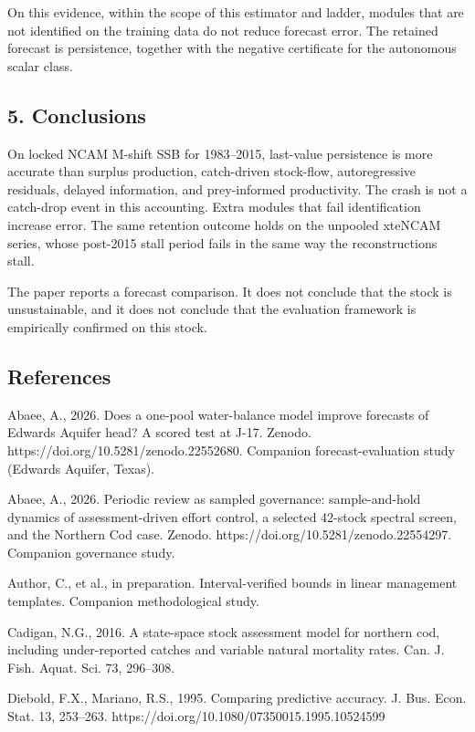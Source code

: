 \documentclass[11pt]{article}
\begin{document}
On this evidence, within the scope of this estimator and ladder, modules
that are not identified on the training data do not reduce forecast
error. The retained forecast is persistence, together with the negative
certificate for the autonomous scalar class.

\subsection{5. Conclusions}\label{conclusions}

On locked NCAM M-shift SSB for 1983--2015, last-value persistence is
more accurate than surplus production, catch-driven stock-flow,
autoregressive residuals, delayed information, and prey-informed
productivity. The crash is not a catch-drop event in this accounting.
Extra modules that fail identification increase error. The same
retention outcome holds on the unpooled xteNCAM series, whose post-2015
stall period fails in the same way the reconstructions stall.

The paper reports a forecast comparison. It does not conclude that the
stock is unsustainable, and it does not conclude that the evaluation
framework is empirically confirmed on this stock.

\subsection{References}\label{references}

Abaee, A., 2026. Does a one-pool water-balance model improve forecasts
of Edwards Aquifer head? A scored test at J-17. Zenodo.
https://doi.org/10.5281/zenodo.22552680. Companion forecast-evaluation
study (Edwards Aquifer, Texas).

Abaee, A., 2026. Periodic review as sampled governance: sample-and-hold
dynamics of assessment-driven effort control, a selected 42-stock
spectral screen, and the Northern Cod case. Zenodo.
https://doi.org/10.5281/zenodo.22554297. Companion governance study.

Author, C., et al., in preparation. Interval-verified bounds in linear
management templates. Companion methodological study.

Cadigan, N.G., 2016. A state-space stock assessment model for northern
cod, including under-reported catches and variable natural mortality
rates. Can. J. Fish. Aquat. Sci. 73, 296--308.

Diebold, F.X., Mariano, R.S., 1995. Comparing predictive accuracy. J.
Bus. Econ. Stat. 13, 253--263.
https://doi.org/10.1080/07350015.1995.10524599
\end{document}
